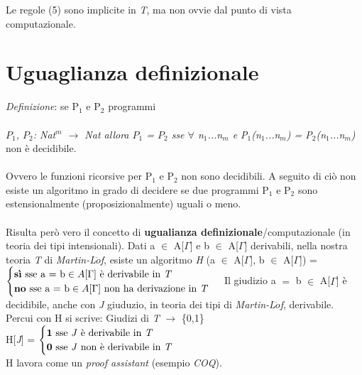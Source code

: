 \noindent
Le regole (5) sono implicite in \textit{T}, ma non ovvie dal punto di vista computazionale.

\section{Uguaglianza definizionale}
\label{sec: uguaglianza-definizionale}
\textit{Definizione}: se P$_1$ e P$_2$ programmi\\\\
\textit{$P_1$, $P_2$: Nat$^m$  $\rightarrow$ Nat \quad allora \quad
$P_1$ = $P_2$ sse $\forall$ n$_1$...n$_m$ e P$_1$(n$_1$...n$_m$) = P$_2$(n$_1$...n$_m$)} non \`e decidibile.\\\\
Ovvero le funzioni ricorsive per P$_1$ e P$_2$ non sono decidibili. A seguito di ci\`o non esiste un algoritmo in grado di decidere se due programmi P$_1$ e P$_2$ sono estensionalmente (proposizionalmente) uguali o meno.\\\\
Risulta per\`o vero il concetto di \textbf{ugualianza definizionale}/computazionale (in teoria dei tipi intensionali). Dati a $\in$ A[$\Gamma$] e b $\in$ A[$\Gamma$] derivabili, nella nostra teoria \textit{T} di \textit{Martin-L$\ddot{o}$f}, esiste un algoritmo \textit{H} (a $\in$ A[$\Gamma$], b $\in$ A[$\Gamma$]) =
$
\begin{cases}
\text{\textbf{sì} sse a = b} \in A[\Gamma]  \text{ è derivabile in \textit{T}} \\
\text{\textbf{no} sse a = b} \in A[\Gamma] \text{ non ha derivazione in \textit{T}}
\end{cases}
$
Il giudizio a $=$ b $\in$ A[$\Gamma$] \`e decidibile, anche con \textit{J} giuduzio, in teoria dei tipi di \textit{Martin-L$\ddot{o}$f}, derivabile. Percui con H si scrive: Giudizi di \textit{T} $\rightarrow$ \{0,1\}\\
H[\textit{J}] =
$
\begin{cases}
\textbf{1} \text{ sse \textit{J} è derivabile in \textit{T}}  \\
\textbf{0} \text{ sse \textit{J} non è derivabile in \textit{T}}
\end{cases}
$
\\
H lavora come un \textit{proof assistant} (esempio \textit{COQ}).\\\\
\noindent

